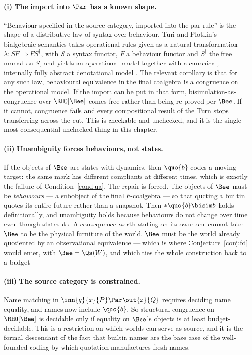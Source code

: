 \paragraph{(i) The import into $\Par$ has a known shape.}
``Behaviour specified in the source category, imported into the par
rule'' is the shape of a distributive law of syntax over behaviour.
Turi and Plotkin's bialgebraic semantics takes operational rules
given as a natural transformation $\lambda : SF \Rightarrow
FS^{\dagger}$, with $S$ a syntax functor, $F$ a behaviour functor
and $S^{\dagger}$ the free monad on $S$, and yields an operational
model together with a canonical, internally fully abstract
denotational model \cite{turiplotkin}.
The relevant corollary is that for any such law, behavioural
equivalence in the final coalgebra is a congruence on the
operational model.
If the import can be put in that form, bisimulation-as-congruence
over $\RHO[\Bee]$ comes free rather than being re-proved per
$\Bee$.
If it cannot, congruence fails and every compositional result of
the Turn stops transferring across the cut.
This is checkable and unchecked, and it is the single most
consequential unchecked thing in this chapter.

\paragraph{(ii) Unambiguity forces behaviours, not states.}
If the objects of $\Bee$ are states with dynamics, then $\quo{b}$
codes a moving target: the same mark has different compliants at
different times, which is exactly the failure of
Condition~\ref{cond:ua}.
The repair is forced.
The objects of $\Bee$ must be \emph{behaviours} --- a subobject of
the final $F$-coalgebra --- so that quoting a builtin quotes its
entire future rather than a snapshot.
Then $*\quo{b} \bisim b$ holds definitionally, and unambiguity
holds because behaviours do not change over time even though states
do.
A consequence worth stating on its own: one cannot take $\Bee$ to
be the physical furniture of the world.
$\Bee$ must be the world already quotiented by an observational
equivalence --- which is where Conjecture~\ref{conj:fd} would
enter, with $\Bee = \Qs(W)$, and which ties the whole construction
back to a budget.

\paragraph{(iii) The source category is constrained.}
Name matching in $\inn{y}{x}{P} \Par \out{x}{Q}$ requires deciding
name equality, and names now include $\quo{b}$.
So structural congruence on $\RHO[\Bee]$ is decidable only if
equality on $\Bee$'s objects is at least budget-decidable.
This is a restriction on which worlds can serve as source, and it
is the formal descendant of the fact that builtin names are the
base case of the well-founded coding by which quotation
manufactures fresh names.

